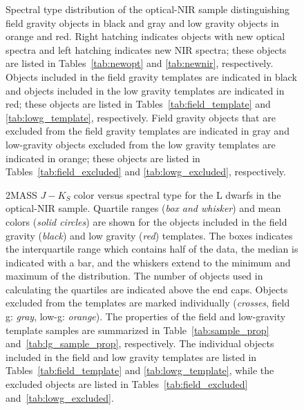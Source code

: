 \documentclass[12pt,preprint]{aastex}
\begin{document}
\begin{figure}
		\caption{Spectral type distribution of the optical-NIR sample distinguishing field gravity objects in black and gray and low gravity objects in orange and red.	 
		Right hatching indicates objects with new optical spectra and left hatching indicates new NIR spectra; these objects are listed in Tables~\ref{tab:newopt} and \ref{tab:newnir}, respectively.
		Objects included in the field gravity templates are indicated in black and objects included in the low gravity templates are indicated in red; these objects are listed in Tables~\ref{tab:field_template} and \ref{tab:lowg_template}, respectively.
		Field gravity objects that are excluded from the field gravity templates are indicated in gray and low-gravity objects excluded from the low gravity templates are indicated in orange; these objects are listed in Tables~\ref{tab:field_excluded} and \ref{tab:lowg_excluded}, respectively.}
	\label{fig:spthist}
\end{figure}

\begin{figure}
		\caption{2MASS $J-K_S$ color versus spectral type for the L dwarfs in the optical-NIR sample. 
		Quartile ranges (\emph{box and whisker}) and mean colors (\emph{solid circles}) are shown for the objects included in the field gravity (\emph{black}) and low gravity (\emph{red}) templates. The boxes indicates the interquartile range which contains half of the data, the median is indicated with a bar, and the whiskers extend to the minimum and maximum of the distribution. The number of objects used in calculating the quartiles are indicated above the end caps.
		Objects excluded from the templates are marked individually (\emph{crosses}, field g: \emph{gray}, low-g: \emph{orange}).
		The properties of the field and low-gravity template samples are summarized in Table~\ref{tab:sample_prop} and~\ref{tab:lg_sample_prop}, respectively. The individual objects included in the field and low gravity templates are listed in Tables~\ref{tab:field_template} and \ref{tab:lowg_template}, while the excluded objects are listed in Tables~\ref{tab:field_excluded} and~\ref{tab:lowg_excluded}.}
	\label{fig:JK_colors}
\end{figure}
\end{document}
